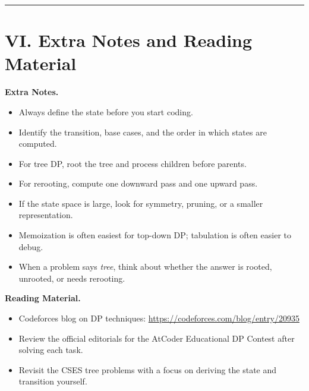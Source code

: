 \documentclass[11pt]{article}
\begin{document}
\vspace{1em}
\hrule
\vspace{1em}

\section*{VI. Extra Notes and Reading Material}

\textbf{Extra Notes.}

\begin{itemize}
\item Always define the state before you start coding.
\item Identify the transition, base cases, and the order in which states are
      computed.
\item For tree DP, root the tree and process children before parents.
\item For rerooting, compute one downward pass and one upward pass.
\item If the state space is large, look for symmetry, pruning, or a smaller
      representation.
\item Memoization is often easiest for top-down DP; tabulation is often easier
      to debug.
\item When a problem says \textit{tree}, think about whether the answer is
      rooted, unrooted, or needs rerooting.
\end{itemize}

\medskip

\textbf{Reading Material.}

\begin{itemize}
\item Codeforces blog on DP techniques:
{\small\url{https://codeforces.com/blog/entry/20935}}
\item Review the official editorials for the AtCoder Educational DP Contest
      after solving each task.
\item Revisit the CSES tree problems with a focus on deriving the state and
      transition yourself.
\end{itemize}
\end{document}
